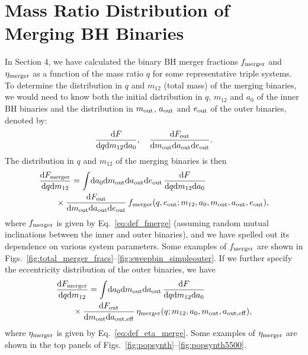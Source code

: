 \documentclass[
        fleqn,
        usenatbib,
    ]{mnras}
\newcommand*{\md}[0]{\mathrm{d}}
\begin{document}
\section{Mass Ratio Distribution of Merging BH Binaries}\label{s:q_dist}

In Section 4, we have calculated the binary BH merger fractions $f_{\rm merger}$
and $\eta_{\rm merger}$ as a function of the mass ratio $q$ for some
representative triple systems. To determine the distribution in $q$ and $m_{12}$
(total mass) of the merging binaries, we would need to know both the
initial distribution in $q$, $m_{12}$ and $a_0$ of the inner BH binaries and the
distribution in $m_{\rm out}$, $a_{\rm out}$ and $e_{\rm out}$ of the outer
binaries, denoted by:
\begin{align}
    \frac{\md F}{ \md q \md m_{12} \md a_0},\quad
    \frac{\md F_{\rm out}}{ \md m_{\rm out} \md a_{\rm out} \md e_{\rm out}}.
\end{align}
The distribution in $q$ and $m_{12}$ of the merging binaries is then
\begin{align}
    & {\md F_{\rm merger}\over \md q \md m_{12}} = \int \!\md a_0 \md m_{\rm
        out}\md a_{\rm out}\md e_{\rm out}\, {\md F\over \md q \md m_{12} \md
        a_0}\nonumber\\
    &\qquad \times {\md F_{\rm out}\over \md m_{\rm out} \md a_{\rm out} \md  e_{\rm out}}\,
      f_{\rm merger}(q,e_{\rm out}; m_{12},a_0,m_{\rm out},a_{\rm out},e_{\rm out}),
      \label{eq:dong1}
\end{align}
where $f_{\rm merger}$ is given by Eq.~\eqref{eq:def_fmerge} (assuming random
mutual inclinations between the inner and outer binaries), and we have spelled
out its dependence on various system parameters. Some examples of $f_{\rm
merger}$ are shown in
Figs.~\ref{fig:total_merger_fracs}--\ref{fig:sweepbin_simpleouter}. If we
further specify the eccentricity distribution of the outer binaries, we have
\begin{align}
    & {\md F_{\rm merger}\over \md q \md m_{12}} = \int
        \!\md a_0 \md m_{\rm out}\md a_{\rm out}\,
        {\md F\over \md q \md m_{12} \md a_0}\nonumber\\
    &\qquad \times {\md F_{\rm out}\over \md m_{\rm out} \md a_{\rm out,eff}}\,
        \eta_{\rm merger}(q; m_{12},a_0,m_{\rm out},a_{\rm out,eff}),
        \label{eq:dong2}
\end{align}
where $\eta_{\rm merger}$ is given by Eq.~\eqref{eq:def_eta_merge}. Some
examples of $\eta_{\rm merger}$ are shown in the top panels of
Figs.~\ref{fig:popsynth}--\ref{fig:popsynth5500}.
\end{document}
